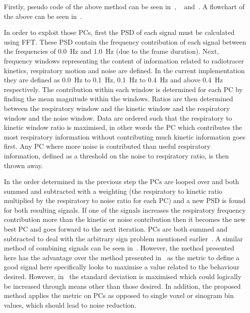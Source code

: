                     Firstly, pseudo code of the above method can be seen in~, ~ and~. A flowchart of the above can be seen in~.
                    
                    In order to exploit those \glspl{PC}, first the \gls{PSD} of each signal must be calculated using \gls{FFT}. These \gls{PSD} contain the frequency contribution of each signal between the frequencies of \SI{0.0}{\hertz} and \SI{1.0}{\hertz} (due to the frame duration). Next, frequency windows representing the content of information related to radiotracer kinetics, respiratory motion and noise are defined. In the current implementation they are defined as \SI{0.0}{\hertz} to \SI{0.1}{\hertz}, \SI{0.1}{\hertz} to \SI{0.4}{\hertz} and above \SI{0.4}{\hertz} respectively. The contribution within each window is determined for each \gls{PC} by finding the mean magnitude within the windows. Ratios are then determined between the respiratory window and the kinetic window and the respiratory window and the noise window. Data are ordered such that the respiratory to kinetic window ratio is maximised, in other words the \gls{PC} which contributes the most respiratory information without contributing much kinetic information goes first. Any \gls{PC} where more noise is contributed than useful respiratory information, defined as a threshold on the noise to respiratory ratio, is then thrown away.
                    
                    In the order determined in the previous step the \glspl{PC} are looped over and both summed and subtracted with a weighting (the respiratory to kinetic ratio multiplied by the respiratory to noise ratio for each \gls{PC}) and a new \gls{PSD} is found for both resulting signals. If one of the signals increases the respiratory frequency contribution more than the kinetic or noise contribution then it becomes the new best \gls{PC} and goes forward to the next iteration. \glspl{PC} are both summed and subtracted to deal with the arbitrary sign problem mentioned earlier~. A similar method of combining signals can be seen in~\parencite{Kesner2010AMethods}. However, the method presented here has the advantage over the method presented in~\parencite{Kesner2010AMethods} as the metric to define a good signal here specifically looks to maximise a value related to the behaviour desired. However, in~\parencite{Kesner2010AMethods} the standard deviation is maximised which could logically be increased through means other than those desired. In addition, the proposed method applies the metric on \glspl{PC} as opposed to single voxel or sinogram bin values, which should lead to noise reduction.
                
